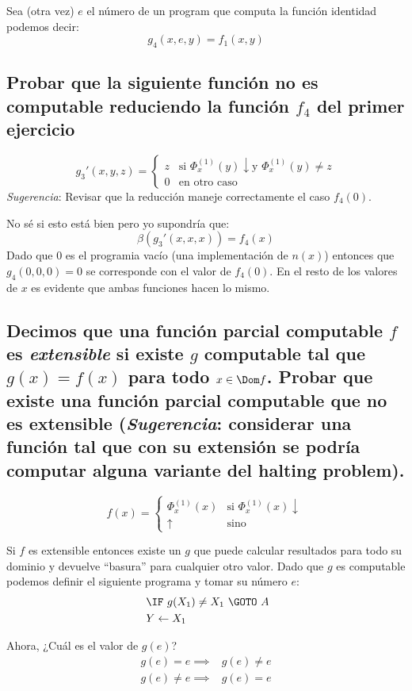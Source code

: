 \documentclass[fleqn, 11pt]{article}
\newcommand{\indef}{\uparrow}
\newcommand{\ddef}{\downarrow}
\newcommand{\into}{\leftarrow}
\begin{document}
Sea (otra vez) $e$ el número de un program que computa la función identidad
podemos decir:
\[
	g_4(x, e, y) = f_1(x, y)
\]

\subsection{Probar que la siguiente función no es computable reduciendo la
función $f_4$ del primer ejercicio}

\[
	g_3'(x, y, z) =
	\begin{cases}
		z & \text{si } \Phi^{(1)}_x(y) \ddef \text{y }
		    \Phi^{(1)}_x(y) \neq z \\
		0 & \text{en otro caso}
	\end{cases}
\]
\emph{Sugerencia}: Revisar que la reducción maneje correctamente el caso
$f_4(0)$.

No sé si esto está bien pero yo supondría que:
\[
	\beta(g_3'(x, x, x)) = f_4(x)
\] 
Dado que $0$ es el programia vacío (una implementación de $n(x)$) entonces que
$g_4(0, 0, 0) = 0$ se corresponde con el valor de $f_4(0)$. En el resto de los
valores de $x$ es evidente que ambas funciones hacen lo mismo.

\subsection{Decimos que una función parcial computable $f$ es \emph{extensible}
si existe $g$ computable tal que $g(x) = f(x)$ para todo $x \in \Dom f$. Probar
que existe una función parcial computable que no es extensible
(\emph{Sugerencia}: considerar una función tal que con su extensión se podría
computar alguna variante del halting problem).}
\[
	f(x) =
	\begin{cases}
		\Phi^{(1)}_x(x) & \text{si } \Phi^{(1)}_x(x) \ddef \\
		\indef & \text{sino}
	\end{cases}
\]

Si $f$ es extensible entonces existe un $g$ que puede calcular resultados para
todo su dominio y devuelve ``basura'' para cualquier otro valor. Dado que $g$
es computable podemos definir el siguiente programa y tomar su número $e$:
\begin{align*}
	[A]\ &\IF\ g(X_1) \neq X_1\ \GOTO\ A \\
	     &Y \into X_1
\end{align*}

Ahora, ¿Cuál es el valor de $g(e)$?
\begin{align*}
	g(e) = e    \implies& g(e) \neq e \\
	g(e) \neq e \implies& g(e) = e
\end{align*}
\end{document}
